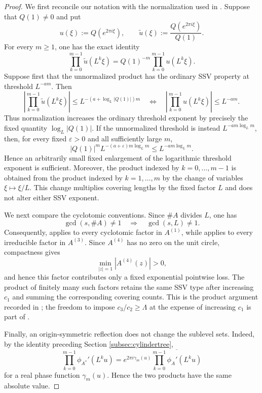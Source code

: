 \documentclass[12pt]{amsart}
\numberwithin{equation}{section}
\begin{document}
\begin{proof}
We first reconcile our notation with the normalization used in \cite{BLV}. Suppose that $Q(1)\neq 0$ and put
\[
 u(\xi):=Q(e^{2\pi i\xi}),
 \qquad
 \widetilde u(\xi):=\frac{Q(e^{2\pi i\xi})}{Q(1)}.
\]
For every $m\geq1$, one has the exact identity
\[
 \prod_{k=0}^{m-1}\widetilde u(L^k\xi)
 =Q(1)^{-m}\prod_{k=0}^{m-1}u(L^k\xi).
\]
Suppose first that the unnormalized product has the ordinary SSV property at threshold $L^{-am}$. Then
\[
 \left|\prod_{k=0}^{m-1}\widetilde u(L^k\xi)\right|
 \leq L^{-(a+\log_L|Q(1)|)m}
 \quad\Longleftrightarrow\quad
 \left|\prod_{k=0}^{m-1}u(L^k\xi)\right|
 \leq L^{-am}.
\]
Thus normalization increases the ordinary threshold exponent by precisely the fixed quantity $\log_L|Q(1)|$. If the unnormalized threshold is instead $L^{-am\log_Lm}$, then, for every fixed $\varepsilon>0$ and all sufficiently large $m$,
\[
 |Q(1)|^mL^{-(a+\varepsilon)m\log_Lm}
 \leq L^{-am\log_Lm}.
\]
Hence an arbitrarily small fixed enlargement of the logarithmic threshold exponent is sufficient. Moreover, the product indexed by $k=0,\ldots,m-1$ is obtained from the product indexed by $k=1,\ldots,m$ by the change of variables $\xi\mapsto \xi/L$. This change multiplies covering lengths by the fixed factor $L$ and does not alter either SSV exponent.

We next compare the cyclotomic conventions. Since $\#A$ divides $L$, one has
\[
 \gcd(s,\#A)\neq1
 \quad\Longrightarrow\quad
 \gcd(s,L)\neq1.
\]
Consequently, \cite[Proposition 4.2]{BLV} applies to every cyclotomic factor in $A^{(1)}$, while \cite[Proposition 4.3]{BLV} applies to every irreducible factor in $A^{(3)}$. Since $A^{(4)}$ has no zero on the unit circle, compactness gives
\[
 \min_{|z|=1}|A^{(4)}(z)|>0,
\]
and hence this factor contributes only a fixed exponential pointwise loss. The product of finitely many such factors retains the same SSV type after increasing $c_1$ and summing the corresponding covering counts. This is the product argument recorded in \cite[Proposition 4.1]{BLV}; the freedom to impose $c_3/c_2\geq\Lambda$ at the expense of increasing $c_1$ is part of \cite[Definition 1.3]{BLV}.

Finally, an origin-symmetric reflection does not change the sublevel sets. Indeed, by the identity preceding Section \ref{subsec:cylindertree},
\[
 \prod_{k=0}^{m-1}\phi_{A^*}'(L^ku)
 =e^{2\pi i\gamma_m(u)}
 \overline{\prod_{k=0}^{m-1}\phi_A'(L^ku)}
\]
for a real phase function $\gamma_m(u)$. Hence the two products have the same absolute value.
\end{proof}
\end{document}
